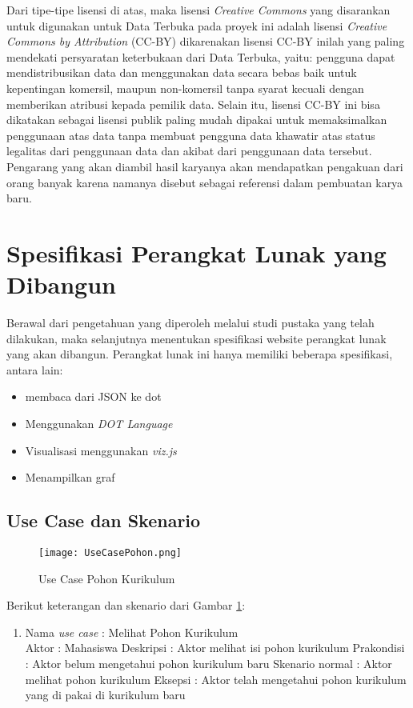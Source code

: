 Dari tipe-tipe lisensi di atas, maka lisensi \textit{Creative Commons} yang disarankan untuk digunakan untuk Data Terbuka pada proyek ini adalah lisensi \textit{Creative Commons by Attribution} (CC-BY) dikarenakan lisensi CC-BY inilah yang paling mendekati persyaratan keterbukaan dari Data Terbuka, yaitu: pengguna dapat mendistribusikan data dan menggunakan data secara bebas baik untuk kepentingan komersil, maupun non-komersil tanpa syarat kecuali dengan memberikan atribusi kepada pemilik data. Selain itu, lisensi CC-BY ini bisa dikatakan sebagai lisensi publik paling mudah dipakai untuk memaksimalkan penggunaan atas data tanpa membuat pengguna data khawatir atas status legalitas dari penggunaan data dan akibat dari penggunaan data tersebut. Pengarang yang akan diambil hasil karyanya akan mendapatkan pengakuan dari orang banyak karena namanya disebut sebagai referensi dalam pembuatan karya baru.


\section{Spesifikasi Perangkat Lunak yang Dibangun}
\label{sec: Spesifikasi Perangkat Lunak yang Dibangun}

Berawal dari pengetahuan yang diperoleh melalui studi pustaka yang telah dilakukan, maka selanjutnya
menentukan spesifikasi website perangkat lunak yang akan dibangun. Perangkat lunak ini hanya
memiliki beberapa spesifikasi, antara lain:
\begin{itemize}
\item membaca dari JSON ke dot 
\item Menggunakan \textit{DOT Language}
\item Visualisasi menggunakan \textit{viz.js}
\item Menampilkan graf
\end{itemize}

\subsection{Use Case dan Skenario}
\label{sec: Use Case dan Skenario}

\begin{figure}[H]
		\centering
		\texttt{[image: UseCasePohon.png]}
		\caption{Use Case Pohon Kurikulum}
		\label{fig: Use Case Pohon Kurikulum}
\end{figure}	

Berikut keterangan dan skenario dari Gambar \ref{fig: Use Case Pohon Kurikulum}:
\begin{enumerate}
\item Nama \textit{use case} : Melihat Pohon Kurikulum \\
	  Aktor : Mahasiswa 
	  Deskripsi :  Aktor melihat isi pohon kurikulum 
	  Prakondisi : Aktor belum mengetahui pohon kurikulum baru 
	  Skenario normal : Aktor melihat pohon kurikulum
	  Eksepsi : Aktor telah mengetahui pohon kurikulum yang di pakai di kurikulum baru
	  
\end{enumerate}



